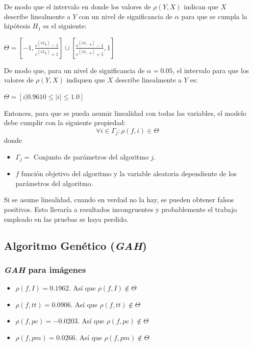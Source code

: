     De modo que el intervalo en donde los valores de $\rho(Y, X)$
indican que $X$ describe linealmente a $Y$ con un nivel de
significancia de $\alpha$ para que se cumpla la hipótesis $H_1$ es
el siguiente:

\begin{center}
$\Theta = \left[-1, \displaystyle\frac{e^{\left(2 Z_{\frac{\alpha}{2}}\right)} - 1}{e^{\left(2 Z_{\frac{\alpha}{2}}\right)} + 1}\right] \cup \left[\displaystyle\frac{e^{\left(2 Z_{1 - \frac{\alpha}{2}}\right)} - 1}{e^{\left(2 Z_{1 - \frac{\alpha}{2}}\right)} + 1}, 1\right]$
\end{center}

    De modo que, para un nivel de significancia de $\alpha = 0.05$,
el intervalo para que los valores de $\rho(Y, X)$ indiquen que $X$
describe linealmente a $Y$ es:
\begin{center}
    $\Theta = \left[ i | 0.9610 \leq |i| \leq 1.0 \right]$
\end{center}

    Entonces, para que se pueda asumir linealidad con todas las
variables, el modelo debe cumplir con la siguiente propiedad:
\begin{equation} \label{eq:lineal}
    \forall i \in \Gamma_j : \rho(f, i) \in \Theta
\end{equation}
donde 
\begin{itemize}
    \item $\Gamma_j = $ Conjunto de parámetros del algoritmo $j$.
    \item $f$ función objetivo del algoritmo y la variable
aleatoria dependiente de los parámetros del algoritmo.
\end{itemize}

    Si se asume linealidad, cuando en verdad no la hay, se pueden
obtener falsos positivos. Esto llevaría a resultados incongruentes
y probablemente el trabajo empleado en las pruebas se haya perdido.

\subsection{Algoritmo Genético (\emph{GAH})}

\subsubsection{\emph{GAH} para imágenes}

\begin{itemize}
    \item $\rho(f, I) = 0.1962$. Así que $\rho(f, I) \notin \Theta$
    \item $\rho(f, tt) = 0.0906$. Así que $\rho(f, tt) \notin \Theta$
    \item $\rho(f, pc) = -0.0203$. Así que $\rho(f, pc) \notin \Theta$
    \item $\rho(f, pm) = 0.0266$. Así que $\rho(f, pm) \notin \Theta$
\end{itemize}

